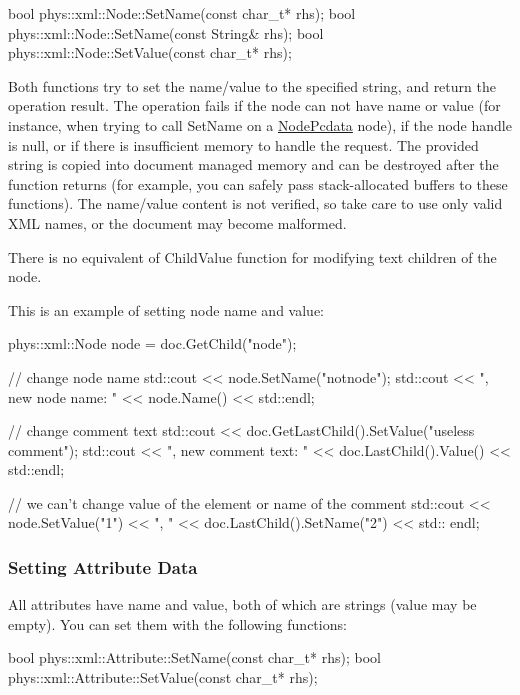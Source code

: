 \begin{DoxyCode}
 bool phys::xml::Node::SetName(const char_t* rhs);
 bool phys::xml::Node::SetName(const String& rhs);
 bool phys::xml::Node::SetValue(const char_t* rhs);
\end{DoxyCode}
 Both functions try to set the name/value to the specified string, and return the operation result. The operation fails if the node can not have name or value (for instance, when trying to call SetName on a \hyperlink{namespacephys_1_1xml_a668b0cc666a9d49f7c7222a7552115d3}{NodePcdata} node), if the node handle is null, or if there is insufficient memory to handle the request. The provided string is copied into document managed memory and can be destroyed after the function returns (for example, you can safely pass stack-\/allocated buffers to these functions). The name/value content is not verified, so take care to use only valid XML names, or the document may become malformed. \par
 \par
 There is no equivalent of ChildValue function for modifying text children of the node. \par
 \par
 This is an example of setting node name and value: 
\begin{DoxyCode}
 phys::xml::Node node = doc.GetChild("node");

 // change node name
 std::cout << node.SetName("notnode");
 std::cout << ", new node name: " << node.Name() << std::endl;

 // change comment text
 std::cout << doc.GetLastChild().SetValue("useless comment");
 std::cout << ", new comment text: " << doc.LastChild().Value() << std::endl;

 // we can't change value of the element or name of the comment
 std::cout << node.SetValue("1") << ", " << doc.LastChild().SetName("2") << std::
      endl;
\end{DoxyCode}
 \hypertarget{XMLManual_XMLModifyingAttributeData}{}\subsubsection{Setting Attribute Data}\label{XMLManual_XMLModifyingAttributeData}
All attributes have name and value, both of which are strings (value may be empty). You can set them with the following functions: 
\begin{DoxyCode}
 bool phys::xml::Attribute::SetName(const char_t* rhs);
 bool phys::xml::Attribute::SetValue(const char_t* rhs);
\end{DoxyCode}
